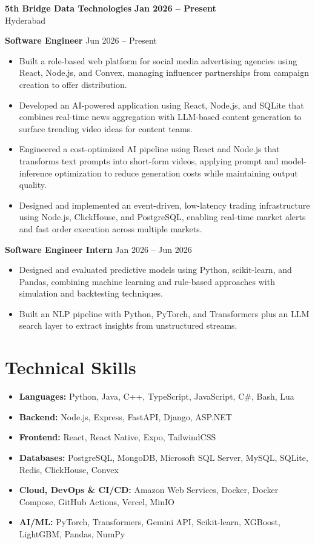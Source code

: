 \documentclass[a4paper,11pt]{article}
\newcommand{\resumeItem}[1]{\item \small{#1}}
\newcommand{\resumeSubheading}[4]{%
  \textbf{#1} \hfill \textbf{#2} \\
{#3} \hfill {#4}
}
\newcommand{\resumeSubHeadingListStart}{\begin{itemize}}
\newcommand{\resumeSubHeadingListEnd}{\end{itemize}}
\begin{document}
\resumeSubheading
{5th Bridge Data Technologies}{Jan 2026 -- Present}
{Hyderabad}{}

\textbf{Software Engineer} \hfill {Jun 2026 -- Present}
\resumeSubHeadingListStart
\resumeItem{Built a role-based web platform for social media advertising agencies using React, Node.js, and Convex, managing influencer partnerships from campaign creation to offer distribution.}
\resumeItem{Developed an AI-powered application using React, Node.js, and SQLite that combines real-time news aggregation with LLM-based content generation to surface trending video ideas for content teams.}
\resumeItem{Engineered a cost-optimized AI pipeline using React and Node.js that transforms text prompts into short-form videos, applying prompt and model-inference optimization to reduce generation costs while maintaining output quality.}
\resumeItem{Designed and implemented an event-driven, low-latency trading infrastructure using Node.js, ClickHouse, and PostgreSQL, enabling real-time market alerts and fast order execution across multiple markets.}
\resumeSubHeadingListEnd

\textbf{Software Engineer Intern} \hfill {Jan 2026 -- Jun 2026}
\resumeSubHeadingListStart
\resumeItem{Designed and evaluated predictive models using Python, scikit-learn, and Pandas, combining machine learning and rule-based approaches with simulation and backtesting techniques.}
\resumeItem{Built an NLP pipeline with Python, PyTorch, and Transformers plus an LLM search layer to extract insights from unstructured streams.}
\resumeSubHeadingListEnd


\section*{Technical Skills}
\begin{itemize}
\item \textbf{Languages:} Python, Java, C++, TypeScript, JavaScript, C\#, Bash, Lua
\item \textbf{Backend:} Node.js, Express, FastAPI, Django, ASP.NET
\item \textbf{Frontend:} React, React Native, Expo, TailwindCSS
\item \textbf{Databases:} PostgreSQL, MongoDB, Microsoft SQL Server, MySQL, SQLite, Redis, ClickHouse, Convex
\item \textbf{Cloud, DevOps \& CI/CD:} Amazon Web Services, Docker, Docker Compose, GitHub Actions, Vercel, MinIO
\item \textbf{AI/ML:} PyTorch, Transformers, Gemini API, Scikit-learn, XGBoost, LightGBM, Pandas, NumPy
\end{itemize}
\vspace{-0.2em}
\end{document}
